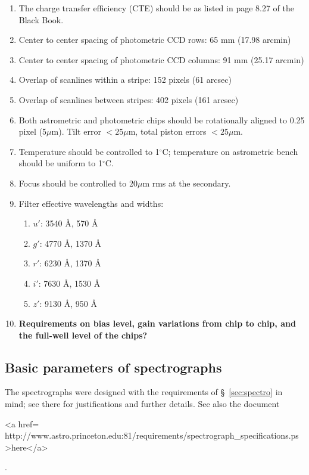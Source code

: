 \begin{enumerate}
\item The charge transfer efficiency (CTE) should be as listed in page 8.27
of the Black Book. 

\item Center to center spacing of photometric CCD rows: 65 mm (17.98 arcmin)

\item Center to center spacing of photometric CCD columns: 91 mm (25.17 arcmin)

\item Overlap of scanlines within a stripe: 152 pixels (61 arcsec)

\item Overlap of scanlines between stripes: 402 pixels (161 arcsec)

\item Both astrometric and photometric chips should be rotationally
aligned to {0.25} pixel ({5}$\mu$m). Tilt error ${}< {25}\mu$m, total
piston errors ${}< {25}\mu$m.  

\item Temperature should be controlled to {1}$^\circ$C;
temperature on astrometric bench should be uniform to
{1}$^\circ$C.

\item Focus should be controlled to {20}$\mu$m rms at the secondary.

\item Filter effective wavelengths and widths:
\begin{enumerate}
\item $u'$: 3540 \AA, 570 \AA
\item $g'$: 4770 \AA, 1370 \AA
\item $r'$: 6230 \AA, 1370 \AA
\item $i'$: 7630 \AA, 1530 \AA
\item $z'$: 9130 \AA, 950 \AA
\end{enumerate}

\item {\bf Requirements on bias level, gain variations from chip to
chip, and the full-well level of the chips?}

\end{enumerate}

\subsection{Basic parameters of spectrographs}
\label{sec:spectro-params}
The spectrographs were designed with the requirements of
\S~\ref{sec:spectro} in mind; see there for justifications and
further details.  See also the document 
\begin{rawhtml}
<a href=
http://www.astro.princeton.edu:81/requirements/spectrograph_specifications.ps>here</a>\end{rawhtml}. 

